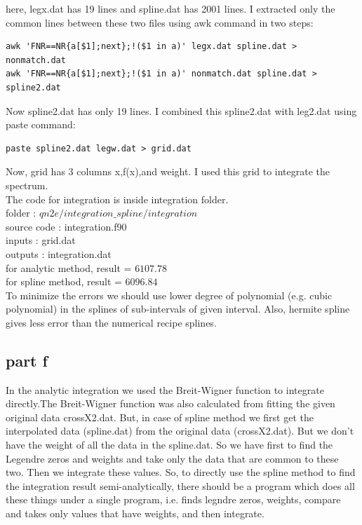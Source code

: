 \documentclass[11pt,a4paper,english]{article}
\begin{document}
here, legx.dat has 19 lines and spline.dat has 2001 lines. I extracted only the common lines between these two files using awk command in two steps:
\noindent
\begin{verbatim}
awk 'FNR==NR{a[$1];next};!($1 in a)' legx.dat spline.dat > nonmatch.dat     
awk 'FNR==NR{a[$1];next};!($1 in a)' nonmatch.dat spline.dat > spline2.dat
\end{verbatim}

Now spline2.dat has only 19 lines. I combined this spline2.dat with leg2.dat using paste command:\\
\begin{verbatim}
paste spline2.dat legw.dat > grid.dat
\end{verbatim}
Now, grid has 3 columns x,f(x),and weight. I used this grid to integrate the spectrum.\\
The code for integration is inside integration folder.\\
    folder       : $qn2e/integration\_spline/integration$\\
	source code  : integration.f90\\
	inputs       : grid.dat\\
	outputs      : integration.dat\\
	
for analytic method,  result = $6107.78$\\
for spline   method,  result = $6096.84$\\

To minimize the errors we should use lower degree of polynomial (e.g. cubic polynomial) in the splines of sub-intervals of given interval. Also, hermite spline gives less error than the numerical recipe splines.
	
	\subsection{part f}
In the analytic integration we used the Breit-Wigner function to integrate directly.The Breit-Wigner function was also calculated from fitting the given original data crossX2.dat. But, in case of spline method we first get the interpolated data (spline.dat) from the original data (crossX2.dat). But we don't have the weight of all the data in the spline.dat. So we have first to find the Legendre zeros and weights and take only the data that are common to these two. Then we integrate these values. So, to directly use the spline method to find the integration result semi-analytically, there should be a program which does all these things under a single program, i.e. finds legndre zeros, weights, compare and takes only values that have weights, and then integrate.
\end{document}
